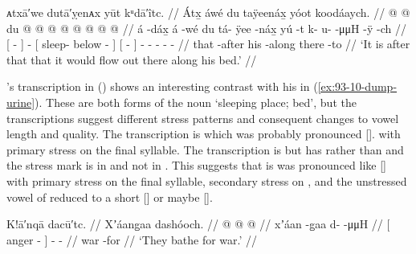 \ex\label{ex:93-11-flow-out}%
%
\begingl
	\glpreamble	ᴀtxā′we dutā′ỵenᴀx yūt kᵘdā′îtc. //
	\glpreamble	Átx̱ áwé du taÿeenáx̱ yóot koodáaych. //
	\gla	{}  @ {} {}  @ {}
		{} du  @ {} @ {} {}
		{}  @ {} {}
		 @ {} @ {} @ {} @ {} @ {} //
	\glb	{} á -dáx̱ {} á -wé
		{} du tá- ÿee -náx̱ {}
		{} yú -t {}
		k- u-  -μμH -ÿ -ch //
	\glc	{}[  - {}]  -
		{}[  sleep- below - {}]
		{}[  - {}]
		- -  - - - //
	\gld {} that -after {}  {}
		{} his  {} -along {}
		{} there -to {}
		 {} {} {} {} {} //
	\glft	‘It is after that that it would flow out there along his bed.’
		//
\endgl
\xe

\citeauthor{swanton:1909}’s transcription  in (\lastx) shows an interesting contrast with his  in (\ref{ex:93-10-dump-urine}).
These are both forms of the noun  ‘sleeping place; bed’, but the transcriptions suggest different stress patterns and consequent changes to vowel length and quality.
The transcription  is  which was probably pronounced []. with primary stress on the final  syllable.
The transcription  is  but \citeauthor{swanton:1909} has  rather than  and the stress mark  is in  and not in .
This suggests that  is  was pronounced like [] with primary stress on the final  syllable, secondary stress on , and the unstressed vowel of  reduced to a short [] or maybe [].

\ex\label{ex:93-12-bathe-for-war}%
%
\begingl
	\glpreamble	K!ā′nqā dacū′tc. //
	\glpreamble	Xʼáang̱aa dashóoch. //
	\gla	{}  @ {} {} 
		 @ {} @ {} //
	\glb	{} xʼáan -g̱aa {}
		d-  -μμH //
	\glc	{}[ anger - {}]
		-  - //
	\gld	{} war -for {}
		 {} {} //
	\glft	‘They bathe for war.’
		//
\endgl
\xe

